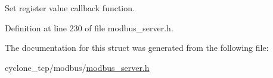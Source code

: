 Set register value callback function. 



Definition at line 230 of file modbus\+\_\+server.\+h.



The documentation for this struct was generated from the following file\+:\begin{DoxyCompactItemize}
\item 
cyclone\+\_\+tcp/modbus/\hyperlink{modbus__server_8h}{modbus\+\_\+server.\+h}\end{DoxyCompactItemize}
